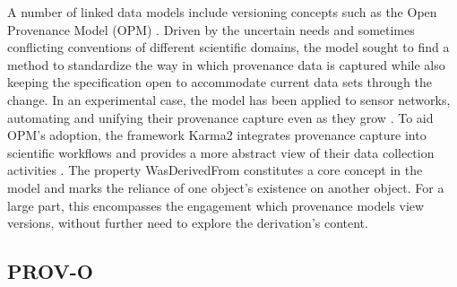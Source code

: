 A number of linked data models include versioning concepts such as the Open Provenance Model (OPM) \cite{moreau2008open}.
Driven by the uncertain needs and sometimes conflicting conventions of different scientific domains, the model sought to find a method to standardize the way in which provenance data is captured while also keeping the specification open to accommodate current data sets through the change.
In an experimental case, the model has been applied to sensor networks, automating and unifying their provenance capture even as they grow \cite{5478496}.
To aid OPM's adoption, the framework Karma2 integrates provenance capture into scientific workflows and provides a more abstract view of their data collection activities \cite{simmhan2010karma2}.
The property WasDerivedFrom constitutes a core concept in the model and marks the reliance of one object's existence on another object.
For a large part, this encompasses the engagement which provenance models view versions, without further need to explore the derivation's content.

\subsection{PROV-O}

